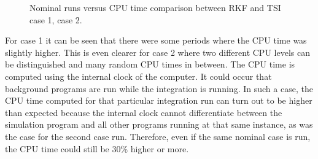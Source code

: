 \begin{figure}[H]
\centering
{} 
\caption{Nominal runs versus CPU time comparison between \ac{RKF} and \ac{TSI} \protect{} case 1,  \protect{} case 2. } 
\label{fig:multiRunVsCPUcase1RKFTSIsmall} 
\end{figure} 

\noindent
For case 1 it can be seen that there were some periods where the CPU time was slightly higher. This is even clearer for case 2 where two different CPU levels can be distinguished and many random CPU times in between. The CPU time is computed using the internal clock of the computer. It could occur that background programs are run while the integration is running. In such a case, the CPU time computed for that particular integration run can turn out to be higher than expected because the internal clock cannot differentiate between the simulation program and all other programs running at that same instance, as was the case for the second case run. Therefore, even if the same nominal case is run, the CPU time could still be 30\% higher or more. 

